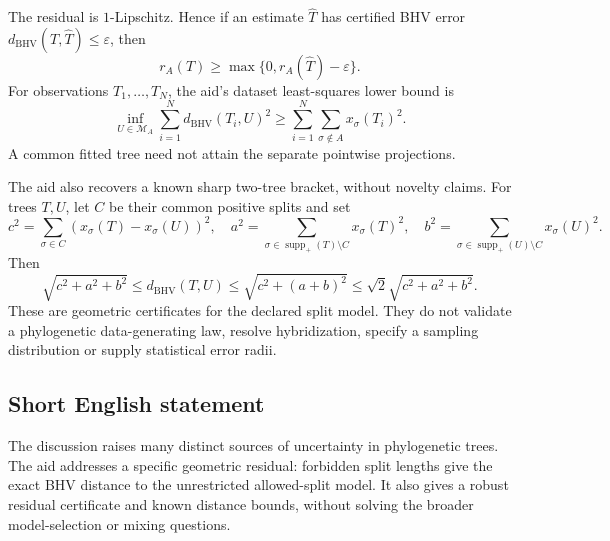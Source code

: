 \documentclass[11pt]{article}
\begin{document}
The residual is $1$-Lipschitz. Hence if an estimate $\widehat T$ has certified BHV error $d_{\mathrm{BHV}}(T,\widehat T)\leq\varepsilon$, then
\[
 r_A(T)\geq\max\{0,r_A(\widehat T)-\varepsilon\}.
\]
For observations $T_1,\ldots,T_N$, the aid's dataset least-squares lower bound is
\[
 \inf_{U\in\mathcal M_A}\sum_{i=1}^N d_{\mathrm{BHV}}(T_i,U)^2
 \geq\sum_{i=1}^N\sum_{\sigma\notin A}x_\sigma(T_i)^2.
\]
A common fitted tree need not attain the separate pointwise projections.

The aid also recovers a known sharp two-tree bracket, without novelty claims. For trees $T,U$, let $C$ be their common positive splits and set
\[
 c^2=\sum_{\sigma\in C}(x_\sigma(T)-x_\sigma(U))^2,\quad
 a^2=\sum_{\sigma\in\operatorname{supp}_+(T)\setminus C}x_\sigma(T)^2,\quad
 b^2=\sum_{\sigma\in\operatorname{supp}_+(U)\setminus C}x_\sigma(U)^2.
\]
Then
\[
 \sqrt{c^2+a^2+b^2}\leq d_{\mathrm{BHV}}(T,U)
 \leq\sqrt{c^2+(a+b)^2}\leq\sqrt2\sqrt{c^2+a^2+b^2}.
\]
These are geometric certificates for the declared split model. They do not validate a phylogenetic data-generating law, resolve hybridization, specify a sampling distribution or supply statistical error radii.
\subsection{Short English statement}
The discussion raises many distinct sources of uncertainty in phylogenetic trees. The aid addresses a specific geometric residual: forbidden split lengths give the exact BHV distance to the unrestricted allowed-split model. It also gives a robust residual certificate and known distance bounds, without solving the broader model-selection or mixing questions.
\end{document}
